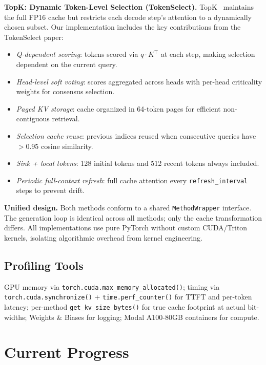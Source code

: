 \documentclass[conference]{IEEEtran}
\begin{document}
\textbf{TopK: Dynamic Token-Level Selection (TokenSelect).} TopK~\cite{topk} maintains the full FP16 cache but restricts each decode step's attention to a dynamically chosen subset. Our implementation includes the key contributions from the TokenSelect paper:
\begin{itemize}
    \item \textit{Q-dependent scoring}: tokens scored via $q \cdot K^\top$ at each step, making selection dependent on the current query.
    \item \textit{Head-level soft voting}: scores aggregated across heads with per-head criticality weights for consensus selection.
    \item \textit{Paged KV storage}: cache organized in 64-token pages for efficient non-contiguous retrieval.
    \item \textit{Selection cache reuse}: previous indices reused when consecutive queries have $>$0.95 cosine similarity.
    \item \textit{Sink + local tokens}: 128 initial tokens and 512 recent tokens always included.
    \item \textit{Periodic full-context refresh}: full cache attention every \texttt{refresh\_interval} steps to prevent drift.
\end{itemize}

\textbf{Unified design.} Both methods conform to a shared \texttt{MethodWrapper} interface. The generation loop is identical across all methods; only the cache transformation differs. All implementations use pure PyTorch without custom CUDA/Triton kernels, isolating algorithmic overhead from kernel engineering.

\subsection{Profiling Tools}
GPU memory via \texttt{torch.cuda.max\_memory\_allocated()}; timing via \texttt{torch.cuda.synchronize()} + \texttt{time.perf\_counter()} for TTFT and per-token latency; per-method \texttt{get\_kv\_size\_bytes()} for true cache footprint at actual bit-widths; Weights \& Biases for logging; Modal A100-80GB containers for compute.

\section{Current Progress}
\end{document}
